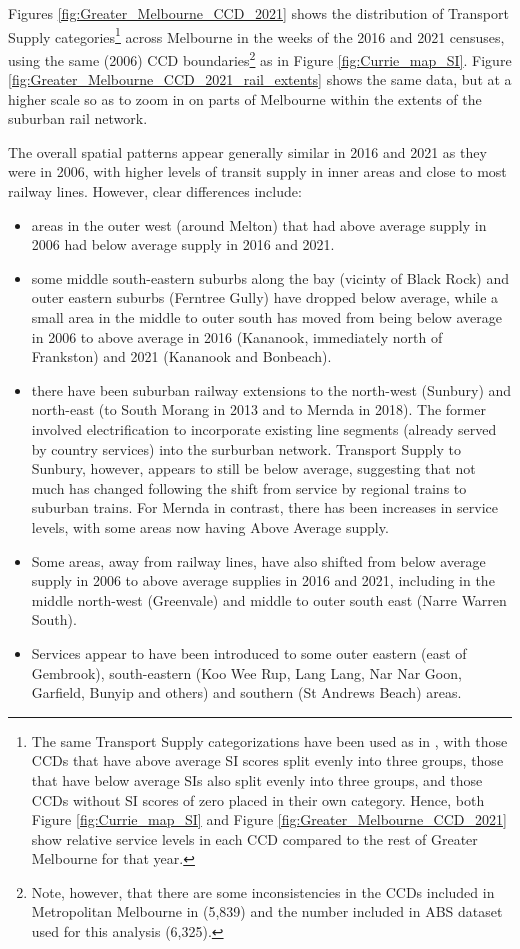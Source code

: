 \documentclass[preprint, 3p,
authoryear]{elsarticle} %
\providecommand{\tightlist}{%
  \setlength{\itemsep}{0pt}\setlength{\parskip}{0pt}}
\begin{document}
Figures \ref{fig:Greater_Melbourne_CCD_2021} shows the distribution of
Transport Supply categories\footnote{The same Transport Supply
  categorizations have been used as in \citet{currie2010identifying},
  with those CCDs that have above average SI scores split evenly into
  three groups, those that have below average SIs also split evenly into
  three groups, and those CCDs without SI scores of zero placed in their
  own category. Hence, both Figure \ref{fig:Currie_map_SI} and Figure
  \ref{fig:Greater_Melbourne_CCD_2021} show relative service levels in
  each CCD compared to the rest of Greater Melbourne for that year.}
across Melbourne in the weeks of the 2016 and 2021 censuses, using the
same (2006) CCD boundaries\footnote{Note, however, that there are some
  inconsistencies in the CCDs included in Metropolitan Melbourne in
  \citet{currie2010identifying} (5,839) and the number included in ABS
  dataset used for this analysis (6,325).} as in Figure
\ref{fig:Currie_map_SI}. Figure
\ref{fig:Greater_Melbourne_CCD_2021_rail_extents} shows the same data,
but at a higher scale so as to zoom in on parts of Melbourne within the
extents of the suburban rail network.

The overall spatial patterns appear generally similar in 2016 and 2021
as they were in 2006, with higher levels of transit supply in inner
areas and close to most railway lines. However, clear differences
include:

\begin{itemize}
\tightlist
\item
  areas in the outer west (around Melton) that had above average supply
  in 2006 had below average supply in 2016 and 2021.
\item
  some middle south-eastern suburbs along the bay (vicinty of Black
  Rock) and outer eastern suburbs (Ferntree Gully) have dropped below
  average, while a small area in the middle to outer south has moved
  from being below average in 2006 to above average in 2016 (Kananook,
  immediately north of Frankston) and 2021 (Kananook and Bonbeach).
\item
  there have been suburban railway extensions to the north-west
  (Sunbury) and north-east (to South Morang in 2013 and to Mernda in
  2018). The former involved electrification to incorporate existing
  line segments (already served by country services) into the surburban
  network. Transport Supply to Sunbury, however, appears to still be
  below average, suggesting that not much has changed following the
  shift from service by regional trains to suburban trains. For Mernda
  in contrast, there has been increases in service levels, with some
  areas now having Above Average supply.
\item
  Some areas, away from railway lines, have also shifted from below
  average supply in 2006 to above average supplies in 2016 and 2021,
  including in the middle north-west (Greenvale) and middle to outer
  south east (Narre Warren South).
\item
  Services appear to have been introduced to some outer eastern (east of
  Gembrook), south-eastern (Koo Wee Rup, Lang Lang, Nar Nar Goon,
  Garfield, Bunyip and others) and southern (St Andrews Beach) areas.
\end{itemize}
\end{document}
